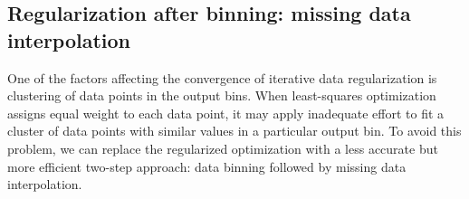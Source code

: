 
\subsection{Regularization after binning: missing data interpolation}


One of the factors affecting the convergence of iterative data
regularization is clustering of data points in the output bins. When
least-squares optimization assigns equal weight to each data point, it
may apply inadequate effort to fit a cluster of data points with
similar values in a particular output bin. To avoid this problem, we
can replace the regularized optimization with a less accurate but more
efficient two-step approach: data binning followed by missing data
interpolation.

